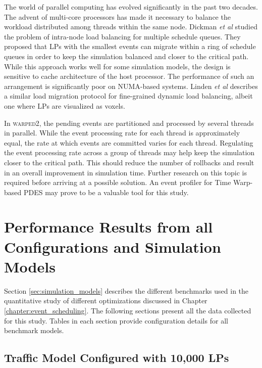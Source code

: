 \documentclass[11pt]{book}
\begin{document}
The world of parallel computing has evolved significantly in the past two decades.  The advent of multi-core
processors has made it necessary to balance the workload distributed among threads within the same node.
Dickman \emph{et al} \cite{dickman-13} studied the problem of intra-node load balancing for multiple schedule
queues.  They proposed that LPs with the smallest events can migrate within a ring of schedule queues in order
to keep the simulation balanced and closer to the critical path. While this approach works well for some
simulation models, the design is sensitive to cache architecture of the host processor.  The performance of
such an arrangement is significantly poor on NUMA-based systems.  Linden \emph{et al} \cite{linden-18}
describes a similar load migration protocol for fine-grained dynamic load balancing, albeit one where LPs are
visualized as voxels.

In \textsc{warped2}, the pending events are partitioned and processed by several threads in parallel.  While
the event processing rate for each thread is approximately equal, the rate at which events are committed
varies for each thread.  Regulating the event processing rate across a group of threads may help keep the
simulation closer to the critical path.  This should reduce the number of rollbacks and result in an overall
improvement in simulation time.  Further research on this topic is required before arriving at a possible
solution.  An event profiler for Time Warp-based PDES may prove to be a valuable tool for this study.


 \markright{}

\appendix

\chapter[All Results]{Performance Results from all Configurations and Simulation Models}

Section \ref{sec:simulation_models} describes the different benchmarks used in the quantitative study of
different optimizations discussed in Chapter \ref{chapter:event_scheduling}. The following sections present
all the data collected for this study. Tables in each section provide configuration details for all benchmark
models.

\section[\textsc{traffic-10k lp}s]{Traffic Model Configured with 10,000 LPs}
\end{document}
